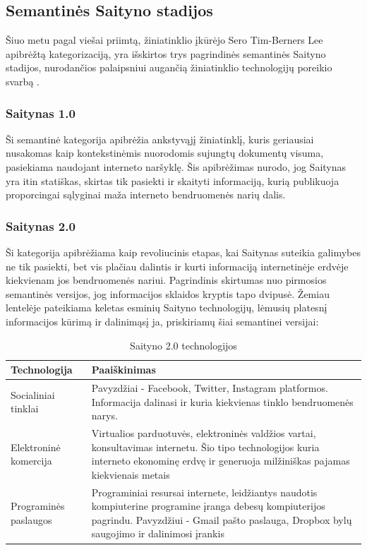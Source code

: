 \documentclass{VUMIFPSkursinis}
\begin{document}
\subsection{Semantinės Saityno stadijos}
Šiuo metu pagal viešai priimtą, žiniatinklio įkūrėjo Sero Tim-Berners Lee apibrėžtą kategorizaciją, yra išskirtos trys pagrindinės semantinės Saityno stadijos, nurodančios palaipsniui augančią žiniatinklio technologijų poreikio svarbą \cite{NS09}.

\subsubsection{Saitynas 1.0}
Ši semantinė kategorija apibrėžia ankstyvąjį žiniatinklį, kuris geriausiai nusakomas kaip kontekstinėmis nuorodomis sujungtų dokumentų visuma, pasiekiama naudojant interneto naršyklę. Šis apibrėžimas nurodo, jog Saitynas yra itin statiškas, skirtas tik pasiekti ir skaityti informaciją, kurią publikuoja proporcingai sąlyginai maža interneto bendruomenės narių dalis.

\subsubsection{Saitynas 2.0}
Ši kategorija apibrėžiama kaip revoliucinis etapas, kai Saitynas suteikia galimybes ne tik pasiekti, bet vis plačiau dalintis ir kurti informaciją internetinėje erdvėje kiekvienam jos bendruomenės nariui. Pagrindinis skirtumas nuo pirmosios semantinės versijos, jog informacijos sklaidos kryptis tapo dvipusė. Žemiau lentelėje pateikiama keletas esminių Saityno technologijų, lėmusių platesnį informacijos kūrimą ir dalinimąsį ja, priskiriamų šiai semantinei versijai: 

\begin{table}[H]
  \centering
  \caption{Saityno 2.0 technologijos}
  {\begin{tabular}{|m{13em}|m{13em}|} \hline
     Technologija & Paaiškinimas \\
    \hline
    Socialiniai tinklai & Pavyzdžiai - Facebook, Twitter, Instagram platformos. Informacija dalinasi ir kuria kiekvienas tinklo bendruomenės narys.\\
 \hline
Elektroninė komercija &
     Virtualios parduotuvės, elektroninės valdžios vartai, konsultavimas internetu. Šio tipo technologijos kuria interneto ekonominę erdvę ir generuoja milžiniškas pajamas kiekvienais metais\\
    \hline
     Programinės paslaugos & Programiniai resursai internete, leidžiantys naudotis kompiuterine programine įranga debesų kompiuterijos pagrindu. Pavyzdžiui - Gmail pašto paslauga, Dropbox bylų saugojimo ir dalinimosi įrankis \\
     \hline
  \end{tabular}}
  \label{tab:kompiliavimas_interpretavimas}
\end{table}
\end{document}
